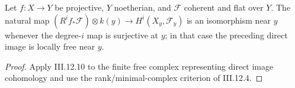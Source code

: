 \begin{theorem}\label{ha-ch3-thm-cohomology-base-change}
Let $f:X\to Y$ be projective, $Y$ noetherian, and $\mathcal F$ coherent and
flat over $Y$.  The natural map
$(R^if_*\mathcal F)\otimes k(y)\to H^i(X_y,\mathcal F_y)$ is an isomorphism
near $y$ whenever the degree-$i$ map is surjective at $y$; in that case the
preceding direct image is locally free near $y$.

\end{theorem}
\begin{proof}
Apply III.12.10 to the finite free complex representing direct
image cohomology and use the rank/minimal-complex criterion of III.12.4.
\end{proof}
